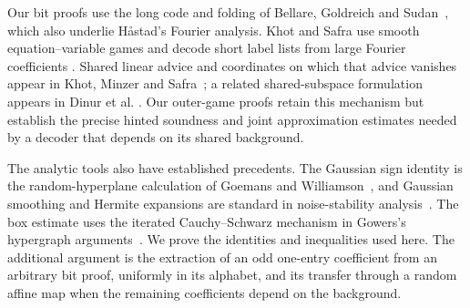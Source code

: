 Our bit proofs use the long code and folding of Bellare, Goldreich and
Sudan~\cite{BGS1998}, which also underlie H\aa stad's Fourier analysis.
Khot and Safra use smooth equation--variable games and decode short label
lists from large Fourier coefficients
\cite[Sections~3.2--3.4 and~5.2]{KS13}.
Shared linear advice and coordinates on which that advice vanishes appear
in Khot, Minzer and Safra~\cite[Sections~3.3--3.4]{KMS17}; a related
shared-subspace formulation appears in Dinur et al.
\cite[Lemma~5.4]{DKKMS2025}.
Our outer-game proofs retain this mechanism but establish the precise
hinted soundness and joint approximation estimates needed by a decoder
that depends on its shared background.

The analytic tools also have established precedents. The Gaussian sign
identity is the random-hyperplane calculation of Goemans and
Williamson~\cite{GW95}, and Gaussian smoothing and Hermite expansions
are standard in noise-stability analysis~\cite{MOO10}. The box estimate
uses the iterated Cauchy--Schwarz mechanism in Gowers's hypergraph
arguments~\cite{Gowers2007}. We prove the identities and inequalities
used here. The additional argument is the extraction of an odd one-entry
coefficient from an arbitrary bit proof, uniformly in its alphabet,
and its transfer through a random affine map when the remaining
coefficients depend on the background.

